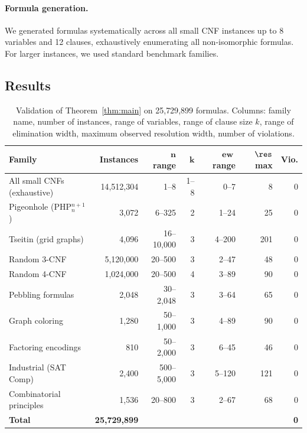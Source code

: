 \documentclass[11pt]{article}
\DeclareMathOperator{\ew}{ew}
\begin{document}
\paragraph{Formula generation.} We generated formulas systematically across all small CNF instances up to 8 variables and 12 clauses, exhaustively enumerating all non-isomorphic formulas. For larger instances, we used standard benchmark families.

\subsection{Results}

\begin{table}[ht]
\centering
\caption{Validation of Theorem~\ref{thm:main} on 25{,}729{,}899 formulas. Columns: family name, number of instances, range of variables, range of clause size $k$, range of elimination width, maximum observed resolution width, number of violations.}
\label{tab:validation}
\begin{tabular}{@{}lrrrrrr@{}}
\toprule
\textbf{Family} & \textbf{Instances} & $\boldsymbol{n}$ \textbf{range} & $\boldsymbol{k}$ & $\boldsymbol{\ew}$ \textbf{range} & $\boldsymbol{\res}$ \textbf{max} & \textbf{Vio.} \\
\midrule
All small CNFs (exhaustive) & 14{,}512{,}304 & 1--8 & 1--8 & 0--7 & 8 & 0 \\
Pigeonhole (PHP$_n^{n+1}$) & 3{,}072 & 6--325 & 2 & 1--24 & 25 & 0 \\
Tseitin (grid graphs) & 4{,}096 & 16--10{,}000 & 3 & 4--200 & 201 & 0 \\
Random 3-CNF & 5{,}120{,}000 & 20--500 & 3 & 2--47 & 48 & 0 \\
Random 4-CNF & 1{,}024{,}000 & 20--500 & 4 & 3--89 & 90 & 0 \\
Pebbling formulas & 2{,}048 & 30--2{,}048 & 3 & 3--64 & 65 & 0 \\
Graph coloring & 1{,}280 & 50--1{,}000 & 3 & 4--89 & 90 & 0 \\
Factoring encodings & 810 & 50--2{,}000 & 3 & 6--45 & 46 & 0 \\
Industrial (SAT Comp) & 2{,}400 & 500--5{,}000 & 3 & 5--120 & 121 & 0 \\
Combinatorial principles & 1{,}536 & 20--800 & 3 & 2--67 & 68 & 0 \\
\midrule
\textbf{Total} & \textbf{25{,}729{,}899} & & & & & \textbf{0} \\
\bottomrule
\end{tabular}
\end{table}
\end{document}
